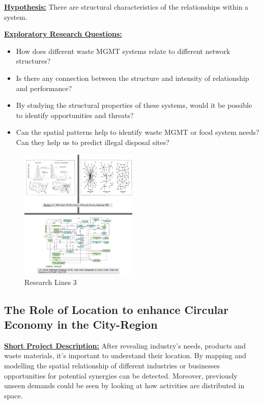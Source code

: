 \textbf{\underline {Hypothesis:}}  There are structural characteristics of the relationships within a system.  \par


\textbf{\underline {Exploratory Research Questions: }} 
\begin{itemize}
    \item How does different waste MGMT systems relate to different network structures? 
    \item Is there any connection between the structure and intensity of relationship and performance?
    \item By studying the structural properties of these systems, would it be possible to identify opportunities and threats?
    \item Can the spatial patterns help to identify waste MGMT or food system needs? Can they help us to predict illegal disposal sites?
\end{itemize}


\begin{figure}[hbt!]
    \centering
    \includegraphics[width=0.5\textwidth]{Imgs/rl_3.PNG}
    \caption{Research Lines 3}
    \label{fig:rl3}
\end{figure}





\subsection{The Role of Location to enhance Circular Economy in the City-Region}
\textbf{\underline {Short Project Description:}} After revealing industry’s needs, products and waste materials, it’s important to understand their location. By mapping and modelling the spatial relationship of different industries or businesses opportunities for potential synergies can be detected. Moreover, previously unseen demands could be seen by looking at how activities are distributed in space.  \par


